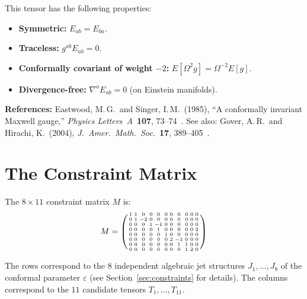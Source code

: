\documentclass[11pt,a4paper]{article}
\begin{document}
This tensor has the following properties:
\begin{itemize}
  \item \textbf{Symmetric:} $E_{ab} = E_{ba}$.
  \item \textbf{Traceless:} $g^{ab}E_{ab} = 0$.
  \item \textbf{Conformally covariant of weight $-2$:}
    $E[\Omega^2 g] = \Omega^{-2}E[g]$.
  \item \textbf{Divergence-free:} $\nabla^a E_{ab} = 0$
    (on Einstein manifolds).
\end{itemize}

\noindent\textbf{References:} Eastwood, M.\,G.\ and Singer, I.\,M.\
(1985), ``A conformally invariant Maxwell gauge,''
\textit{Physics Letters~A}~\textbf{107}, 73--74~\cite{eastwood-singer1985}.
See also: Gover, A.\,R.\ and Hirachi, K.\ (2004),
\textit{J.~Amer.\ Math.\ Soc.}~\textbf{17},
389--405~\cite{gover-hirachi2004}.

\section{The Constraint Matrix}
\label{app:matrix}

The $8 \times 11$ constraint matrix $M$ is:
\[
{\small M = \left(\begin{smallmatrix}
1 & 1 & 0 & 0 & 0 & 0 & 0 & 0 & 0 & 0 & 0 \\
0 & 1 & -2 & 0 & 0 & 0 & 0 & 0 & 0 & 0 & 0 \\
0 & 0 & 0 & 1 & -1 & 0 & 0 & 0 & 0 & 0 & 0 \\
0 & 0 & 0 & 0 & 1 & 0 & 0 & 0 & 0 & 0 & 2 \\
0 & 0 & 0 & 0 & 0 & 1 & 0 & 0 & 0 & 0 & 0 \\
0 & 0 & 0 & 0 & 0 & 0 & 2 & -1 & 0 & 0 & 0 \\
0 & 0 & 0 & 0 & 0 & 0 & 0 & 1 & 1 & 0 & 0 \\
0 & 0 & 0 & 0 & 0 & 0 & 0 & 0 & 1 & 2 & 0
\end{smallmatrix}\right)}
\]

The rows correspond to the $8$ independent algebraic jet structures
$J_1,\ldots,J_8$ of the conformal parameter $\varepsilon$
(see Section~\ref{sec:constraints} for details). The columns correspond to
the $11$ candidate tensors $T_1,\ldots,T_{11}$.
\end{document}
